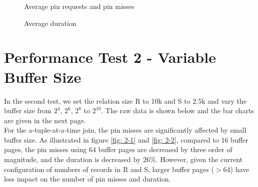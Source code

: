 \documentclass{article}
\begin{document}
\begin{figure}[!htbp]
  \centering
  \caption{Average pin requests and pin misses}
    \label{fig: 1-1}
\end{figure}
\begin{figure}[!htbp]
  \centering
  \caption{Average duration}
    \label{fig: 1-2}
\end{figure}

\newpage
\section{Performance Test 2 - Variable Buffer Size}
In the second test, we set the relation size R to 10k and S to 2.5k and vary the buffer size from $2^4$, $2^6$, $2^8$ to $2^{10}$. The raw data is shown below and the bar charts are given in the next page. \\

For the a-tuple-at-a-time join, the pin misses are significantly affected by small buffer size. As illustrated in figure \ref{fig: 2-1} and \ref{fig: 2-2}, compared to 16 buffer pages, the pin misses using 64 buffer pages are decreased by three order of magnitude, and the duration is decreased by 26\%. However, given the current configuration of numbers of records in R and S, larger buffer pages ($>$64) have less impact on the number of pin misses and duration.\\
\end{document}
